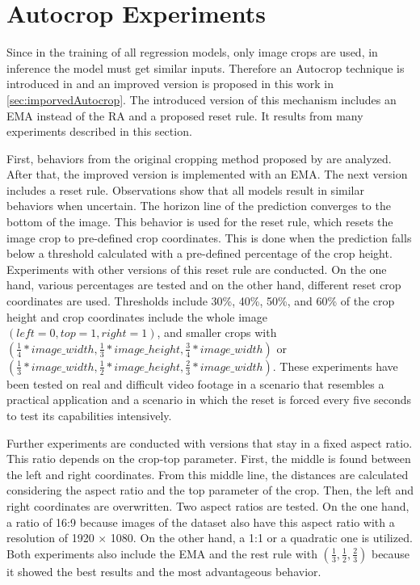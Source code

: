 \section{Autocrop Experiments}

Since in the training of all regression models, only image crops are used, in inference the model must get similar inputs.
Therefore an Autocrop technique is introduced in \cite{tepNet2024} and an improved version is proposed in this work in \autoref{sec:imporvedAutocrop}.
The introduced version of this mechanism includes an \ac{EMA} instead of the \ac{RA} and a proposed reset rule.
It results from many experiments described in this section.

First, behaviors from the original cropping method proposed by \cite{tepNet2024} are analyzed.
After that, the improved version is implemented with an \ac{EMA}.
The next version includes a reset rule.
Observations show that all models result in similar behaviors when uncertain.
The horizon line of the prediction converges to the bottom of the image.
This behavior is used for the reset rule, which resets the image crop to pre-defined crop coordinates.
This is done when the prediction falls below a threshold calculated with a pre-defined percentage of the crop height.
Experiments with other versions of this reset rule are conducted.
On the one hand, various percentages are tested and on the other hand, different reset crop coordinates are used.
Thresholds include 30\%, 40\%, 50\%, and 60\% of the crop height and crop coordinates include the whole image $(left=0, top=1, right=1)$, and smaller crops with $(\frac{1}{4}*image\_width, \frac{1}{3}*image\_height, \frac{3}{4}*image\_width)$ or $(\frac{1}{3}*image\_width, \frac{1}{2}*image\_height, \frac{2}{3}*image\_width)$.
These experiments have been tested on real and difficult video footage in a scenario that resembles a practical application and a scenario in which the reset is forced every five seconds to test its capabilities intensively.

Further experiments are conducted with versions that stay in a fixed aspect ratio.
This ratio depends on the crop-top parameter.
First, the middle is found between the left and right coordinates.
From this middle line, the distances are calculated considering the aspect ratio and the top parameter of the crop.
Then, the left and right coordinates are overwritten.
Two aspect ratios are tested.
On the one hand, a ratio of 16:9 because images of the dataset also have this aspect ratio with a resolution of 1920 $\times$ 1080.
On the other hand, a 1:1 or a quadratic one is utilized.
Both experiments also include the \ac{EMA} and the rest rule with $(\frac{1}{3}, \frac{1}{2}, \frac{2}{3})$ because it showed the best results and the most advantageous behavior.

